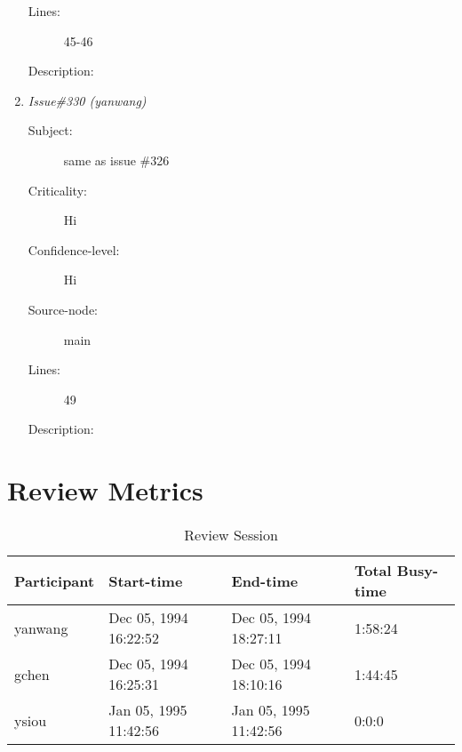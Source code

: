 \begin{enumerate}
\begin{description}
\item [Lines:] 45-46

\item [Description:] 
\end{description}
\item {\it Issue\#330 (yanwang)}
\begin{description}
\item [Subject:] same as issue \#326
\item [Criticality:] Hi
\item [Confidence-level:] Hi
\item [Source-node:] main

\item [Lines:] 49

\item [Description:] 
\end{description}
\end{enumerate}
\section{Review Metrics}
\begin{table}[hb]
\begin{center}
\begin{tabular}{|l|l|l|l|}
\hline
Participant & Start-time & End-time & Total Busy-time \\
\hline
yanwang & Dec 05, 1994 16:22:52 & Dec 05, 1994 18:27:11 & 1:58:24 \\
gchen & Dec 05, 1994 16:25:31 & Dec 05, 1994 18:10:16 & 1:44:45 \\
ysiou & Jan 05, 1995 11:42:56 & Jan 05, 1995 11:42:56 & 0:0:0 \\
\hline
\end{tabular}
\end{center}
\caption{Review Session}
\end{table}


